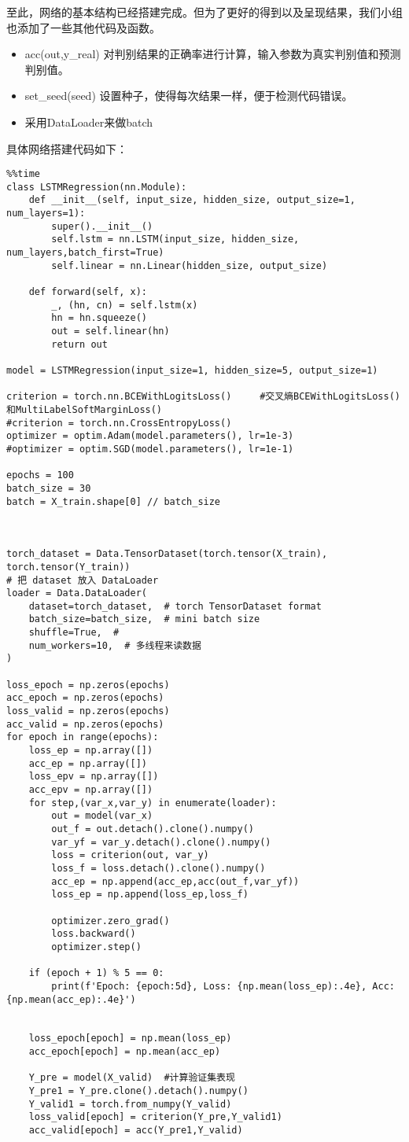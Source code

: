 \documentclass[addpoints,answers]{exam}
\begin{document}
至此，网络的基本结构已经搭建完成。但为了更好的得到以及呈现结果，我们小组也添加了一些其他代码及函数。
\begin{itemize}
    \item acc(out,y\_real) 对判别结果的正确率进行计算，输入参数为真实判别值和预测判别值。
    \item set\_seed(seed)
    设置种子，使得每次结果一样，便于检测代码错误。
    \item 采用DataLoader来做batch
\end{itemize}
具体网络搭建代码如下：
\begin{lstlisting}
%%time
class LSTMRegression(nn.Module):
    def __init__(self, input_size, hidden_size, output_size=1, num_layers=1):
        super().__init__()
        self.lstm = nn.LSTM(input_size, hidden_size, num_layers,batch_first=True)
        self.linear = nn.Linear(hidden_size, output_size)

    def forward(self, x):
        _, (hn, cn) = self.lstm(x)
        hn = hn.squeeze()
        out = self.linear(hn)
        return out

model = LSTMRegression(input_size=1, hidden_size=5, output_size=1)

criterion = torch.nn.BCEWithLogitsLoss()     #交叉熵BCEWithLogitsLoss()和MultiLabelSoftMarginLoss()
#criterion = torch.nn.CrossEntropyLoss()
optimizer = optim.Adam(model.parameters(), lr=1e-3)
#optimizer = optim.SGD(model.parameters(), lr=1e-1)

epochs = 100
batch_size = 30
batch = X_train.shape[0] // batch_size



torch_dataset = Data.TensorDataset(torch.tensor(X_train), torch.tensor(Y_train))
# 把 dataset 放入 DataLoader
loader = Data.DataLoader(
    dataset=torch_dataset,  # torch TensorDataset format
    batch_size=batch_size,  # mini batch size
    shuffle=True,  #
    num_workers=10,  # 多线程来读数据
)

loss_epoch = np.zeros(epochs)
acc_epoch = np.zeros(epochs)
loss_valid = np.zeros(epochs)
acc_valid = np.zeros(epochs)
for epoch in range(epochs):
    loss_ep = np.array([])
    acc_ep = np.array([])
    loss_epv = np.array([])
    acc_epv = np.array([])
    for step,(var_x,var_y) in enumerate(loader):
        out = model(var_x)
        out_f = out.detach().clone().numpy()
        var_yf = var_y.detach().clone().numpy()
        loss = criterion(out, var_y)
        loss_f = loss.detach().clone().numpy()
        acc_ep = np.append(acc_ep,acc(out_f,var_yf))
        loss_ep = np.append(loss_ep,loss_f)
        
        optimizer.zero_grad()
        loss.backward()
        optimizer.step()  
    
    if (epoch + 1) % 5 == 0:
        print(f'Epoch: {epoch:5d}, Loss: {np.mean(loss_ep):.4e}, Acc:{np.mean(acc_ep):.4e}')


    loss_epoch[epoch] = np.mean(loss_ep)
    acc_epoch[epoch] = np.mean(acc_ep)
    
    Y_pre = model(X_valid)  #计算验证集表现
    Y_pre1 = Y_pre.clone().detach().numpy()
    Y_valid1 = torch.from_numpy(Y_valid)
    loss_valid[epoch] = criterion(Y_pre,Y_valid1)
    acc_valid[epoch] = acc(Y_pre1,Y_valid)
\end{lstlisting}
\end{document}
